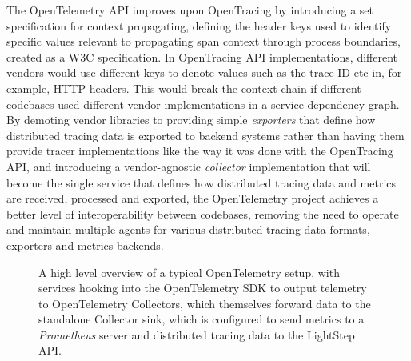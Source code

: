 \documentclass[12pt,pdftex,titlepage]{report}
\begin{document}
                The OpenTelemetry API improves upon OpenTracing by introducing a set specification for context propagating, defining the header keys used to identify specific values 
                relevant to propagating span context through process boundaries, created as a W3C specification. In OpenTracing API implementations, different vendors would use different 
                keys to denote values such as the trace ID etc in, for example, HTTP headers. This would break the context chain if different codebases used different vendor implementations
                in a service dependency graph. By demoting vendor libraries to providing simple \textit{exporters} that define how distributed tracing data is exported to backend systems
                rather than having them provide tracer implementations like the way it was done with the OpenTracing API, and introducing a vendor-agnostic \textit{collector} implementation that 
                will become the single service that defines how distributed tracing data and metrics are received, processed and exported, the OpenTelemetry project achieves a better level of 
                interoperability between codebases, removing the need to operate and maintain multiple agents for various distributed tracing data formats, exporters and metrics backends.

                \begin{figure}[hbt!]
                    \centering
                    \caption{A high level overview of a typical OpenTelemetry setup, with services hooking into the OpenTelemetry SDK to output telemetry to
                    OpenTelemetry Collectors, which themselves forward data to the standalone Collector sink, which is configured to send metrics to a \textit{Prometheus}
                    server and distributed tracing data to the LightStep API.}
                    \label{fig:otexporter}
                \end{figure}
\end{document}
